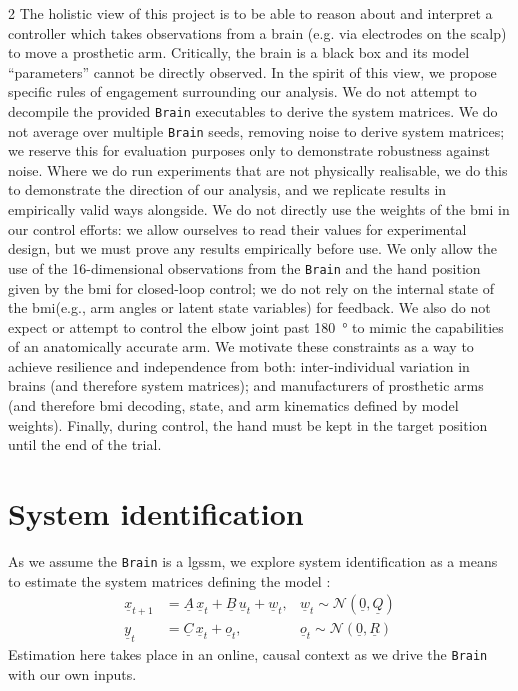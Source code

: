 \documentclass[a4paper, 10pt]{article}
\let\cite\supercite
\newcommand{\Brain}{\texttt{Brain}\xspace}
\newcommand{\LGSSM}{\ac{lgssm}\xspace}
\newcommand{\BMI}{\ac{bmi}\xspace}
\begin{document}
\begin{multicols*}{2}
  The holistic view of this project is to be able to reason about and interpret a
  controller which takes observations from a brain (e.g. via electrodes on the
  scalp) to move a prosthetic arm. Critically, the brain is a black box and its
  model ``parameters'' cannot be directly observed. In the spirit of this view,
  we propose specific rules of engagement surrounding our analysis. We do not
  attempt to decompile the provided \Brain executables to derive the system
  matrices. We do not average over multiple \Brain seeds, removing noise to
  derive system matrices; we reserve this for evaluation purposes only to
  demonstrate robustness against noise. Where we do run experiments that are not
  physically realisable, we do this to demonstrate the direction of our
  analysis, and we replicate results in empirically valid ways alongside. We do
  not directly use the weights of the \BMI in our control efforts: we allow
  ourselves to read their values for experimental design, but we must prove any results empirically before use. We only allow the use of the 16-dimensional
  observations from the \Brain and the hand position given by the \BMI for
  closed-loop control; we do not rely on the internal state of the \BMI (e.g.,
  arm angles or latent state variables) for feedback. We also do not expect or
  attempt to control the elbow joint past \SI{180}{\degree} to mimic the
  capabilities of an anatomically accurate arm. We motivate these constraints as a way
  to achieve resilience and independence from both: inter-individual variation in
  brains (and therefore system matrices); and manufacturers of prosthetic arms
  (and therefore \BMI decoding, state, and arm kinematics defined by model
  weights). Finally, during control, the hand must be kept in the target
  position until the end of the trial.

  \section*{System identification}

  As we assume the \Brain is a \LGSSM, we explore system identification as a
  means to estimate the system matrices defining the model
  \cite{overscheeSubspaceIdentificationLinear1996}:
  \begin{align*}
    \underline{x}_{t+1} & = \underline{A}\,\underline{x}_t + \underline{B}\,\underline{u}_t + \underline{w}_t, & \underline{w}_t \sim \mathcal{N}(\underline{0}, \underline{Q}) \\
    \underline{y}_t     & = \underline{C}\,\underline{x}_t + \underline{o}_t,                                  & \underline{o}_t \sim \mathcal{N}(\underline{0}, \underline{R})
  \end{align*}
  Estimation here takes place in an online, causal context as we drive the
  \Brain with our own inputs.


\end{multicols*}
\end{document}
